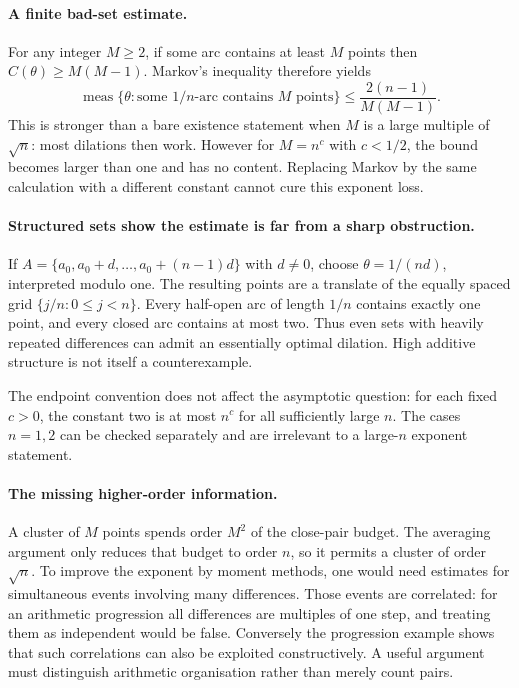 \documentclass[11pt,a4paper]{article}
\begin{document}
\paragraph{A finite bad-set estimate.}
For any integer $M\geq2$, if some arc contains at least $M$ points then $C(\theta)\geq M(M-1)$. Markov's inequality therefore yields
\[
 \operatorname{meas}\{\theta:\text{some }1/n\text{-arc contains }M\text{ points}\}
 \leq\frac{2(n-1)}{M(M-1)}.
\]
This is stronger than a bare existence statement when $M$ is a large multiple of $\sqrt n$: most dilations then work. However for $M=n^c$ with $c<1/2$, the bound becomes larger than one and has no content. Replacing Markov by the same calculation with a different constant cannot cure this exponent loss.

\paragraph{Structured sets show the estimate is far from a sharp obstruction.}
If $A=\{a_0,a_0+d,\ldots,a_0+(n-1)d\}$ with $d\ne0$, choose $\theta=1/(nd)$, interpreted modulo one. The resulting points are a translate of the equally spaced grid $\{j/n:0\leq j<n\}$. Every half-open arc of length $1/n$ contains exactly one point, and every closed arc contains at most two. Thus even sets with heavily repeated differences can admit an essentially optimal dilation. High additive structure is not itself a counterexample.

The endpoint convention does not affect the asymptotic question: for each fixed $c>0$, the constant two is at most $n^c$ for all sufficiently large $n$. The cases $n=1,2$ can be checked separately and are irrelevant to a large-$n$ exponent statement.

\paragraph{The missing higher-order information.}
A cluster of $M$ points spends order $M^2$ of the close-pair budget. The averaging argument only reduces that budget to order $n$, so it permits a cluster of order $\sqrt n$. To improve the exponent by moment methods, one would need estimates for simultaneous events involving many differences. Those events are correlated: for an arithmetic progression all differences are multiples of one step, and treating them as independent would be false. Conversely the progression example shows that such correlations can also be exploited constructively. A useful argument must distinguish arithmetic organisation rather than merely count pairs.
\end{document}
